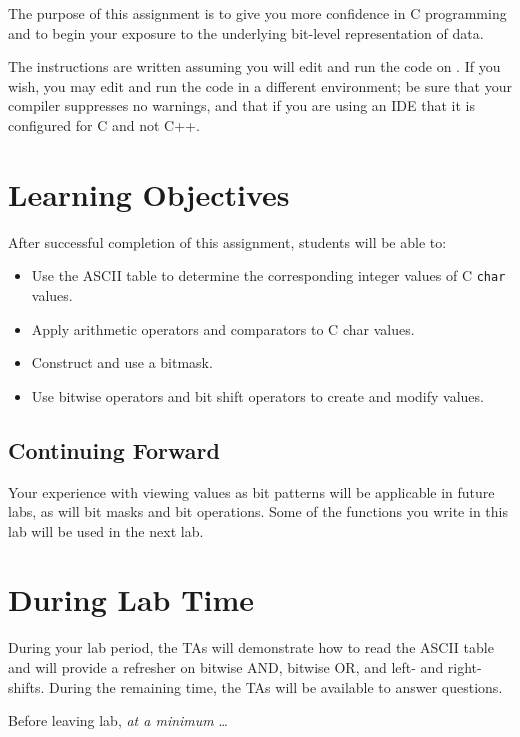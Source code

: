 The purpose of this assignment is to give you more confidence in C programming
and to begin your exposure to the underlying bit-level representation of data.

The instructions are written assuming you will edit and run the code on
\runtimeenvironment. If you wish, you may edit and run the code
in a different environment; be sure that your compiler suppresses no warnings,
and that if you are using an IDE that it is configured for C and not C++.

\section*{Learning Objectives}

After successful completion of this assignment, students will be able to:
\begin{itemize}
    \item Use the ASCII table to determine the corresponding integer values of C
    \lstinline{char} values.
    \item Apply arithmetic operators and comparators to C \lstinline{}{char} values.
    \item Construct and use a bitmask.
    \item Use bitwise operators and bit shift operators to create and modify values.
\end{itemize}

\subsection*{Continuing Forward}

Your experience with viewing values as bit patterns will be applicable in
future labs, as will bit masks and bit operations. Some of the functions you
write in this lab will be used in the next lab.

\section*{During Lab Time}

During your lab period, the TAs will demonstrate how to read the ASCII table and
will provide a refresher on bitwise AND, bitwise OR, and left- and right-shifts.
During the remaining time, the TAs will be available to answer questions.

Before leaving lab, \textit{at a minimum} \dots
